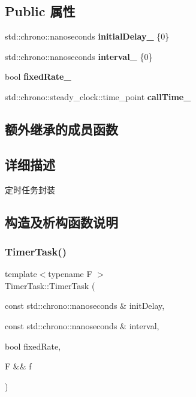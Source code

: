 \subsection*{Public 属性}
\begin{DoxyCompactItemize}
\item 
\mbox{\label{structTimerTask_af49a805f814a0b92e1f96037226a2d2e}} 
std\+::chrono\+::nanoseconds {\bfseries initial\+Delay\+\_\+} \{0\}
\item 
\mbox{\label{structTimerTask_afd954f592d96d8abe152e0f54b30979e}} 
std\+::chrono\+::nanoseconds {\bfseries interval\+\_\+} \{0\}
\item 
\mbox{\label{structTimerTask_a31da300c15d00f58c2950e9752027e42}} 
bool {\bfseries fixed\+Rate\+\_\+}
\item 
\mbox{\label{structTimerTask_a7bcf4dfd5b91038d4c4c5378285d4ed0}} 
std\+::chrono\+::steady\+\_\+clock\+::time\+\_\+point {\bfseries call\+Time\+\_\+}
\end{DoxyCompactItemize}
\subsection*{额外继承的成员函数}


\subsection{详细描述}
定时任务封装 

\subsection{构造及析构函数说明}
\mbox{\label{structTimerTask_ab87d7c5c62a8a079031b39eea3958c65}} 
\subsubsection{\texorpdfstring{Timer\+Task()}{TimerTask()}\hspace{0.1cm}{\footnotesize\ttfamily [1/2]}}
{\footnotesize\ttfamily template$<$typename F $>$ \\
Timer\+Task\+::\+Timer\+Task (\begin{DoxyParamCaption}\item[{const std\+::chrono\+::nanoseconds \&}]{init\+Delay,  }\item[{const std\+::chrono\+::nanoseconds \&}]{interval,  }\item[{bool}]{fixed\+Rate,  }\item[{F \&\&}]{f }\end{DoxyParamCaption})\hspace{0.3cm}{\ttfamily [inline]}}



